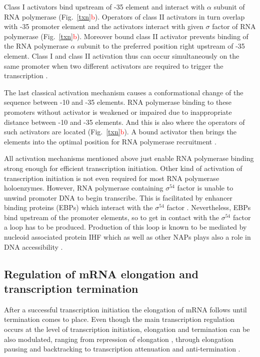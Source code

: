 Class I activators bind upstream of -35 element and interact with $\alpha$ subunit of RNA polymerase \cite{ushida1990helical} (Fig.~\ref{txn}\textcolor{red}{b}).
Operators of class II activators in turn overlap with -35 promoter element and the activators interact with given $\sigma$ factor of RNA polymerase \cite{igarashi1991functional} (Fig.~\ref{txn}\textcolor{red}{b}).
Moreover bound class II activator prevents binding of the RNA polymerase $\alpha$ subunit to the preferred position right upstream of -35 element.
Class I and class II activation thus can occur simultaneously on the same promoter when two different activators are required to trigger the transcription \cite{lloyd2002requirement}.

The last classical activation mechanism causes a conformational change of the sequence between -10 and -35 elements.
RNA polymerase binding to these promoters without activator is weakened or impaired due to inappropriate distance between -10 and -35 elements.
And this is also where the operators of such activators are located (Fig.~\ref{txn}\textcolor{red}{b}).
A bound activator then brings the elements into the optimal position for RNA polymerase recruitment \cite{heldwein2001crystal}.

All activation mechanisms mentioned above just enable RNA polymerase binding strong enough for efficient transcription initiation.
Other kind of activation of transcription initiation is not even required for most RNA polymerase holoenzymes.
However, RNA polymerase containing $\sigma^{54}$ factor is unable to unwind promoter DNA to begin transcribe.
This is facilitated by enhancer binding proteins (EBPs) which interact with the $\sigma^{54}$ factor \cite{morett1989vivo, cannon2000dna}.
Nevertheless, EBPs bind upstream of the promoter elements, so to get in contact with the $\sigma^{54}$ factor a loop has to be produced.
Production of this loop is known to be mediated by nucleoid associated protein IHF which as well as other NAPs plays also a role in DNA accessibility \cite{de1991upstream, sze2001vivo}.

\subsection{Regulation of mRNA elongation and transcription termination}
After a successful transcription initiation the elongation of mRNA follows until termination comes to place.
Even though the main transcription regulation occurs at the level of transcription initiation, elongation and termination can be also modulated, ranging from repression of elongation \cite{monsalve1996protein}, through elongation pausing and backtracking \cite{mustaev2017transcription} to transcription attenuation and anti-termination \cite{naville2009transcription}.

